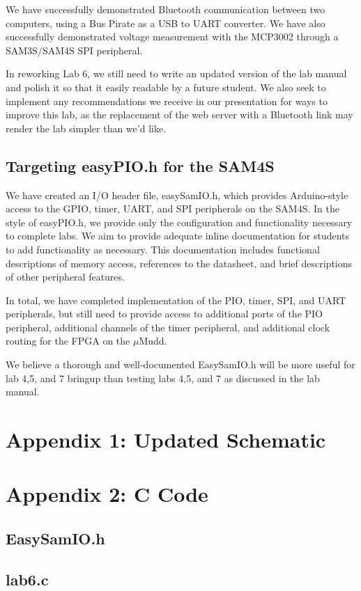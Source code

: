 \documentclass[12pt]{article}
\begin{document}
We have successfully demonstrated Bluetooth communication between two computers, using a Bus Pirate as a USB to UART converter. We have also successfully demonstrated voltage measurement with the MCP3002 through a SAM3S/SAM4S SPI peripheral.

In reworking Lab 6, we still need to write an updated version of the lab manual and polish it so that it easily readable by a future student. We also seek to implement any recommendations we receive in our presentation for ways to improve this lab, as the replacement of the web server with a Bluetooth link may render the lab simpler than we'd like.

\subsection{Targeting easyPIO.h for the SAM4S}

We have created an I/O header file, easySamIO.h, which provides Arduino-style access to the GPIO, timer, UART, and SPI peripherals on the SAM4S. In the style of easyPIO.h, we provide only the configuration and functionality necessary to complete labs. We aim to provide adequate inline documentation for students to add functionality as necessary. This documentation includes functional descriptions of memory access, references to the datasheet, and brief descriptions of other peripheral features.

In total, we have completed implementation of the PIO, timer, SPI, and UART peripherals, but still need to provide access to additional ports of the PIO peripheral, additional channels of the timer peripheral, and additional clock routing for the FPGA on the $\mu$Mudd.

We believe a thorough and well-documented EasySamIO.h will be more useful for lab 4,5, and 7 bringup than testing labs 4,5, and 7 as discussed in the lab manual.

\clearpage
\section{Appendix 1: Updated Schematic}
\clearpage
\section{Appendix 2: C Code}
\subsection{EasySamIO.h}
\pagebreak
\subsection{lab6.c}
\end{document}

